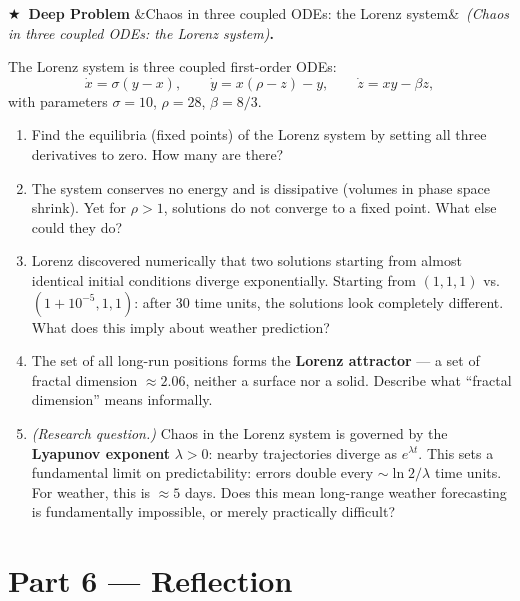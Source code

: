 \documentclass[12pt, a4paper]{article}
\newcounter{problem}
\newcounter{deepproblem}
\newenvironment{deepproblem}[1][]{%
  \refstepcounter{deepproblem}%
  \par\vspace{6pt}%
  \noindent\textbf{\color{NavyBlue}$\bigstar$\ Deep Problem \thedeepproblem}%
  \ifx&#1&\else\ \textit{(#1)}\fi\textbf{.}\enskip
}{\par\vspace{4pt}}
\begin{document}
\begin{deepproblem}[Chaos in three coupled ODEs: the Lorenz system]
The Lorenz system is three coupled first-order ODEs:
\[
  \dot{x} = \sigma(y - x), \qquad
  \dot{y} = x(\rho - z) - y, \qquad
  \dot{z} = xy - \beta z,
\]
with parameters $\sigma = 10$, $\rho = 28$, $\beta = 8/3$.
\begin{enumerate}[label=(\alph*)]
  \item Find the equilibria (fixed points) of the Lorenz system by setting all three derivatives to zero. How many are there?
  \item The system conserves no energy and is dissipative (volumes in phase space shrink). Yet for $\rho > 1$, solutions do not converge to a fixed point. What else could they do?
  \item Lorenz discovered numerically that two solutions starting from almost identical initial conditions diverge exponentially. Starting from $(1, 1, 1)$ vs.\ $(1 + 10^{-5}, 1, 1)$: after 30 time units, the solutions look completely different. What does this imply about weather prediction?
  \item The set of all long-run positions forms the \textbf{Lorenz attractor} --- a set of fractal dimension $\approx 2.06$, neither a surface nor a solid. Describe what ``fractal dimension'' means informally.
  \item \textit{(Research question.)} Chaos in the Lorenz system is governed by the \textbf{Lyapunov exponent} $\lambda > 0$: nearby trajectories diverge as $e^{\lambda t}$. This sets a fundamental limit on predictability: errors double every $\sim \ln 2/\lambda$ time units. For weather, this is $\approx 5$ days. Does this mean long-range weather forecasting is fundamentally impossible, or merely practically difficult?
\end{enumerate}
\end{deepproblem}

\section{Part 6 \texorpdfstring{---}{--} Reflection}
\end{document}
